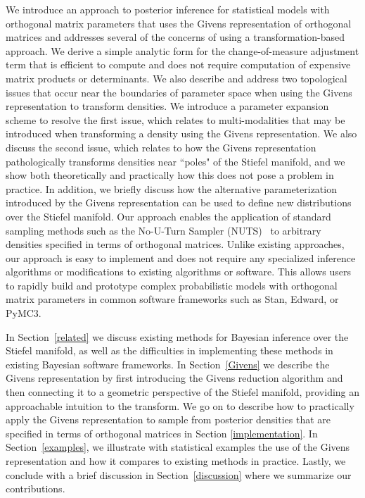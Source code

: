\documentclass[ba]{imsart}
\numberwithin{equation}{section}
\theoremstyle{plain}
\begin{document}
\noindent We introduce an approach to posterior inference for statistical models with orthogonal matrix parameters that uses the Givens representation of orthogonal matrices and addresses several of the concerns of using a transformation-based approach. We derive a simple analytic form for the change-of-measure adjustment term that is efficient to compute and does not require computation of expensive matrix products or determinants. We also describe and address two topological issues that occur near the boundaries of parameter space when using the Givens representation to transform densities. We introduce a parameter expansion scheme to resolve the first issue, which relates to multi-modalities that may be introduced when transforming a density using the Givens representation. We also discuss the second issue, which relates to how the Givens representation pathologically transforms densities near ``poles" of the Stiefel manifold, and we show both theoretically and practically how this does not pose a problem in practice. In addition, we briefly discuss how the alternative parameterization introduced by the Givens representation can be used to define new distributions over the Stiefel manifold. Our approach enables the application of standard sampling methods such as the No-U-Turn Sampler (NUTS)~\citep{hoffman2014no} to arbitrary densities specified in terms of orthogonal matrices. Unlike existing approaches, our approach is easy to implement and does not require any specialized inference algorithms or modifications to existing algorithms or software. This allows users to rapidly build and prototype complex probabilistic models with orthogonal matrix parameters in common software frameworks such as Stan, Edward, or PyMC3. 

\noindent In Section~\ref{related} we discuss existing methods for Bayesian inference over the Stiefel manifold, as well as the difficulties in implementing these methods in existing Bayesian software frameworks. In Section~\ref{Givens} we describe the Givens representation by first introducing the Givens reduction algorithm and then connecting it to a geometric perspective of the Stiefel manifold, providing an approachable intuition to the transform. We go on to describe how to practically apply the Givens representation to sample from posterior densities that are specified in terms of orthogonal matrices in Section \ref{implementation}. In Section~\ref{examples}, we illustrate with statistical examples the use of the Givens representation and how it compares to existing methods in practice. Lastly, we conclude with a brief discussion in Section~\ref{discussion} where we summarize our contributions.
\end{document}
